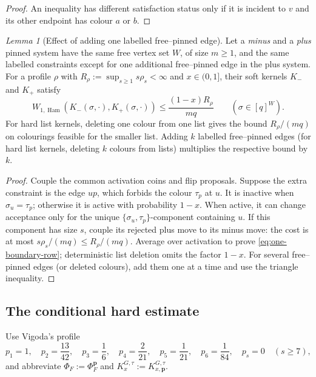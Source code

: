 \documentclass[11pt,reqno]{article}
\theoremstyle{plain}
\newtheorem{lemma}[theorem]{Lemma}
\theoremstyle{definition}
\theoremstyle{remark}
\newtheorem{lemma}[lemma]{Lemma}
\theoremstyle{definition}
\theoremstyle{remark}
\DeclareMathOperator{\Ham}{Ham}
\newcommand{\WHam}{W_{1,\Ham}}                   %
\newcommand{\colours}{[q]}                        %
\newcommand{\flip}{\Phi}                           %
\newcommand{\softK}{K}
\begin{document}
\begin{proof}
An inequality has different satisfaction status only if it is incident to
\(v\) and its other endpoint has colour \(a\) or \(b\).
\end{proof}

\begin{lemma}[Effect of adding one labelled free--pinned edge]
\label{lem:boundary-sensitivity}
Let a \emph{minus} and a \emph{plus} pinned system have the same free
vertex set \(W\), of size \(m\ge1\), and the same labelled constraints
except for one additional free--pinned edge in the plus system.  For a
profile \(\rho\) with \(R_\rho:=\sup_{s\ge1}s\rho_s<\infty\) and
\(x\in(0,1]\), their soft kernels \(K_-\) and \(K_+\) satisfy
\begin{equation}\label{eq:one-boundary-row}
  \WHam(K_-(\sigma,\cdot),K_+(\sigma,\cdot))
  \le\frac{(1-x)R_\rho}{mq}
  \qquad(\sigma\in\colours^W).
\end{equation}
For hard list kernels, deleting one colour from one list gives the bound
\(R_\rho/(mq)\) on colourings feasible for the smaller list.
Adding \(k\) labelled free--pinned edges (for hard list kernels,
deleting \(k\) colours from lists) multiplies the respective bound
by \(k\).
\end{lemma}

\begin{proof}
Couple the common activation coins and flip proposals.  Suppose the extra
constraint is the edge \(up\), which forbids the colour \(\tau_p\) at
\(u\).  It is inactive when \(\sigma_u=\tau_p\); otherwise it is active
with probability \(1-x\).  When active, it can change acceptance only for
the unique \(\{\sigma_u,\tau_p\}\)-component containing \(u\).  If this component has
size \(s\), couple its rejected plus move to its minus move: the cost is
at most \(s\rho_s/(mq)\le R_\rho/(mq)\).
Average over activation to prove \eqref{eq:one-boundary-row}; deterministic
list deletion omits the factor \(1-x\).  For several free--pinned edges
(or deleted colours), add them one at a time and use the triangle
inequality.
\end{proof}
\subsection{The conditional hard estimate}
\label{sec:hard-one-step}

Use Vigoda's profile~\cite{Vigoda2000}
\begin{equation}\label{eq:flip-params}
  p_1=1,\quad p_2=\frac{13}{42},\quad p_3=\frac16,\quad
  p_4=\frac2{21},\quad p_5=\frac1{21},\quad p_6=\frac1{84},\quad
  p_s=0\quad(s\ge7),
\end{equation}
and abbreviate \(\flip_F:=\Phi_F^{\mathbf p}\) and
\(\softK_x^{G,\tau}:=K_{x,\mathbf p}^{G,\tau}\).
\end{document}
